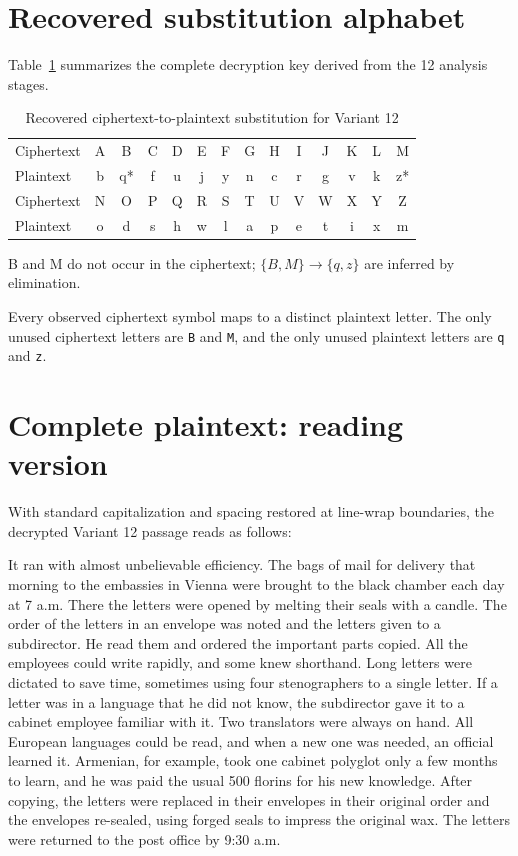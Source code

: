 \documentclass{utmreport}
\begin{document}
\section{Recovered substitution alphabet}
Table~\ref{tab:key} summarizes the complete decryption key derived from the 12 analysis stages.
\begin{table}[!htbp]
\caption{Recovered ciphertext-to-plaintext substitution for Variant 12}\label{tab:key}
\centering\small\setlength{\tabcolsep}{4pt}
\begin{tabular}{l*{13}{c}}\hline
Ciphertext & A&B&C&D&E&F&G&H&I&J&K&L&M\\
Plaintext  & b&q*&f&u&j&y&n&c&r&g&v&k&z*\\\hline
Ciphertext & N&O&P&Q&R&S&T&U&V&W&X&Y&Z\\
Plaintext  & o&d&s&h&w&l&a&p&e&t&i&x&m\\\hline
\end{tabular}
\par\smallskip\normalfont\small *B and M do not occur in the ciphertext; $\{B,M\}\rightarrow\{q,z\}$ are inferred by elimination.
\end{table}

Every observed ciphertext symbol maps to a distinct plaintext letter. The only unused ciphertext letters are \texttt{B} and \texttt{M}, and the only unused plaintext letters are \texttt{q} and \texttt{z}.

\section{Complete plaintext: reading version}
With standard capitalization and spacing restored at line-wrap boundaries, the decrypted Variant 12 passage reads as follows:

It ran with almost unbelievable efficiency. The bags of mail for delivery that morning to the embassies in Vienna were brought to the black chamber each day at 7 a.m. There the letters were opened by melting their seals with a candle. The order of the letters in an envelope was noted and the letters given to a subdirector. He read them and ordered the important parts copied. All the employees could write rapidly, and some knew shorthand. Long letters were dictated to save time, sometimes using four stenographers to a single letter. If a letter was in a language that he did not know, the subdirector gave it to a cabinet employee familiar with it. Two translators were always on hand. All European languages could be read, and when a new one was needed, an official learned it. Armenian, for example, took one cabinet polyglot only a few months to learn, and he was paid the usual 500 florins for his new knowledge. After copying, the letters were replaced in their envelopes in their original order and the envelopes re-sealed, using forged seals to impress the original wax. The letters were returned to the post office by 9:30 a.m.
\end{document}

